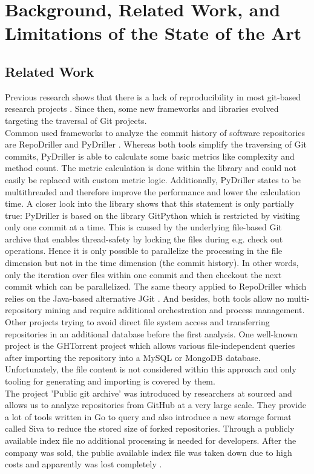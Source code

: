 
\section{Background, Related Work, and Limitations of the State of the Art}
\label{sec:background}
\subsection{Related Work}
Previous research shows that there is a lack of reproducibility in most git-based research projects \cite{Robles2010}. Since then, some new frameworks and libraries evolved targeting the traversal of Git projects.\\
Common used frameworks to analyze the commit history of software repositories are RepoDriller \cite{repodriller} and PyDriller \cite{pydriller,Spadini2018}. Whereas both tools simplify the traversing of Git commits, PyDriller is able to calculate some basic metrics like complexity and method count. The metric calculation is done within the library and could not easily be replaced with custom metric logic. Additionally, PyDriller states to be multithreaded and therefore improve the performance and lower the calculation time. A closer look into the library shows that this statement is only partially true: PyDriller is based on the library GitPython which is restricted by visiting only one commit at a time. This is caused by the underlying file-based Git archive that enables thread-safety by locking the files during e.g. check out operations. Hence it is only possible to parallelize the processing in the file dimension but not in the time dimension (the commit history). In other words, only the iteration over files within one commit and then checkout the next commit which can be parallelized. The same theory applied to RepoDriller which relies on the Java-based alternative JGit \cite{jgit}. And besides, both tools allow no multi-repository mining and require additional orchestration and process management.\\
Other projects trying to avoid direct file system access and transferring repositories in an additional database before the first analysis. One well-known project is the GHTorrent project \cite{Gousios2012, Gousios2015} which allows various file-independent queries after importing the repository into a MySQL or MongoDB database. Unfortunately, the file content is not considered within this approach and only tooling for generating and importing is covered by them. \\
The project 'Public git archive' was introduced by researchers at sourced and allows us to analyze repositories from GitHub at a very large scale. They provide a lot of tools written in Go to query and also introduce a new storage format called Siva to reduce the stored size of forked repositories. Through a publicly available index file no additional processing is needed for developers. After the company was sold, the public available index file was taken down due to high costs and apparently was lost completely \cite{srcdissue}.

